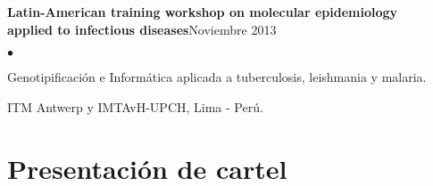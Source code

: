 \documentclass[margin,line]{res}
\newenvironment{list2}{
	\begin{list}{$\bullet$}{%
			\setlength{\itemsep}{0in}
			\setlength{\parsep}{0in} \setlength{\parskip}{0in}
			\setlength{\topsep}{0in} \setlength{\partopsep}{0in}
			\setlength{\leftmargin}{0.2in}}}{\end{list}}
\begin{document}
\begin{resume}
		
		
		
		{\bf Latin-American training workshop on molecular epidemiology \\applied to infectious diseases}\hfill {Noviembre 2013}\\
		\vspace*{-.1in}%
		\begin{list2} %
			\item Genotipificación e Informática aplicada a tuberculosis, leishmania y malaria.
			\item ITM Antwerp y IMTAvH-UPCH, Lima - Perú.\\
		\end{list2}
		
		
		
		\section{\sc Presentación de cartel}
		

\end{resume}
\end{document}
